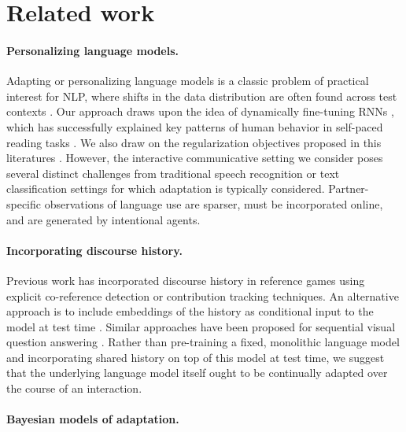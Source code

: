 \documentclass[11pt,a4paper]{article}
\begin{document}
\section{Related work}

\paragraph{Personalizing language models.}
Adapting or personalizing language models is a classic problem of practical interest for NLP, where shifts in the data distribution are often found across test contexts \cite{kneser1993dynamic,riccardi2000stochastic,bellegarda2004statistical,ben2010theory}. 
Our approach draws upon the idea of dynamically fine-tuning RNNs \cite{mikolov2010recurrent,krause2017dynamic}, which has successfully explained key patterns of human behavior in self-paced reading tasks \cite{van2018neural}.
We also draw on the regularization objectives proposed in this literatures \cite{li2007bayesian,liu2016investigations}. 
However, the interactive communicative setting we consider poses several distinct challenges from traditional speech recognition \cite{miao2015speaker} or text classification settings  \cite{blitzer2007biographies,glorot2011domain} for which adaptation is typically considered.
Partner-specific observations of language use are sparser, must be incorporated online, and are generated by intentional agents.

\paragraph{Incorporating discourse history.}

Previous work has incorporated discourse history in reference games using explicit co-reference detection \cite{roy2019leveraging} or contribution tracking \cite{devault_learning_2009} techniques. 
An alternative approach is to include embeddings of the history as conditional input to the model at test time \cite{haber2019photobook}.
Similar approaches have been proposed for sequential visual question answering \cite{ohsugi2019simple,choi2018quac}.
Rather than pre-training a fixed, monolithic language model and incorporating shared history on top of this model at test time, we suggest that the underlying language model itself ought to be continually adapted over the course of an interaction.

\paragraph{Bayesian models of adaptation.}
\end{document}
